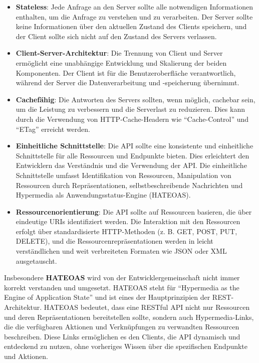 \begin{itemize}
\item  \textbf{Stateless}: Jede Anfrage an den Server sollte alle notwendigen Informationen enthalten, um die Anfrage zu verstehen und zu verarbeiten. Der Server sollte keine Informationen über den aktuellen Zustand des Clients speichern, und der Client sollte sich nicht auf den Zustand des Servers verlassen.
\item  \textbf{Client-Server-Architektur}: Die Trennung von Client und Server ermöglicht eine unabhängige Entwicklung und Skalierung der beiden Komponenten. Der Client ist für die Benutzeroberfläche verantwortlich, während der Server die Datenverarbeitung und -speicherung übernimmt.
\item  \textbf{Cachefähig}: Die Antworten des Servers sollten, wenn möglich, cachebar sein, um die Leistung zu verbessern und die Serverlast zu reduzieren. Dies kann durch die Verwendung von HTTP-Cache-Headern wie \enquote{Cache-Control} und \enquote{ETag} erreicht werden.
\item  \textbf{Einheitliche Schnittstelle}: Die API sollte eine konsistente und einheitliche Schnittstelle für alle Ressourcen und Endpunkte bieten. Dies erleichtert den Entwicklern das Verständnis und die Verwendung der API. Die einheitliche Schnittstelle umfasst Identifikation von Ressourcen, Manipulation von Ressourcen durch Repräsentationen, selbstbeschreibende Nachrichten und Hypermedia als Anwendungsstatus-Engine (HATEOAS).
\item  \textbf{Ressourcenorientierung}: Die API sollte auf Ressourcen basieren, die über eindeutige URIs identifiziert werden. Die Interaktion mit den Ressourcen erfolgt über standardisierte HTTP-Methoden (z. B. GET, POST, PUT, DELETE), und die Ressourcenrepräsentationen werden in leicht verständlichen und weit verbreiteten Formaten wie JSON oder XML ausgetauscht.
\end{itemize}
Insbesondere \textbf{HATEOAS} wird von der Entwicklergemeinschaft nicht immer korrekt verstanden und umgesetzt. HATEOAS steht für \enquote{Hypermedia as the Engine of Application State} und ist eines der Hauptprinzipien der REST-Architektur. HATEOAS bedeutet, dass eine RESTful API nicht nur Ressourcen und deren Repräsentationen bereitstellen sollte, sondern auch Hypermedia-Links, die die verfügbaren Aktionen und Verknüpfungen zu verwandten Ressourcen beschreiben. Diese Links ermöglichen es den Clients, die API dynamisch und entdeckend zu nutzen, ohne vorheriges Wissen über die spezifischen Endpunkte und Aktionen.
